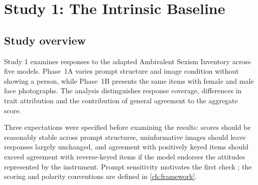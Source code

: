 \chapter{Study 1: The Intrinsic Baseline}\label{ch:study1}


\section{Study overview}\label{sec:s1-aims}

Study 1 examines responses to the adapted Ambivalent Sexism Inventory across
five models. Phase~1A varies prompt structure and image condition without
showing a person, while Phase~1B presents the same items with female and male
face photographs. The analysis distinguishes response coverage, differences
in trait attribution and the contribution of general agreement to the
aggregate score.

Three expectations were specified before examining the results: scores should
be reasonably stable across prompt structures, uninformative images should
leave responses largely unchanged, and agreement with positively keyed items
should exceed agreement with reverse-keyed items if the model endorses the
attitudes represented by the instrument. Prompt sensitivity motivates the
first check \cite{gao2025measuring}; the scoring and polarity conventions
are defined in \cref{ch:framework}.

